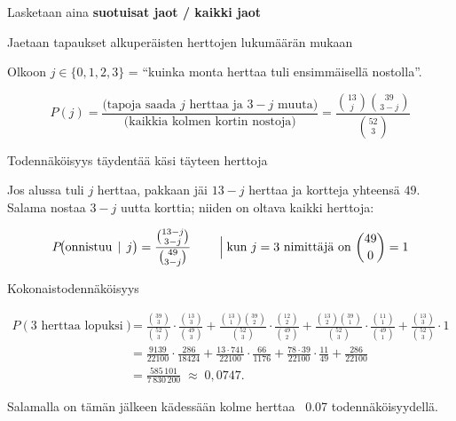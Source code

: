 \documentclass[12pt,a4paper]{article}
\begin{document}
Lasketaan aina \textbf{suotuisat jaot / kaikki jaot}
    
\begin{alakohta}
    
\item Jaetaan tapaukset alkuperäisten herttojen lukumäärän mukaan

Olkoon $j\in\{0,1,2,3\}$ = “kuinka monta herttaa tuli ensimmäisellä nostolla”.

\[
P(j)=\frac{\text{(tapoja saada $j$ herttaa ja $3-j$ muuta)}}{\text{(kaikkia kolmen kortin nostoja)}}=
\frac{\binom{13}{j}\binom{39}{3-j}}{\binom{52}{3}}
\]

\item Todennäköisyys täydentää käsi täyteen herttoja

Jos alussa tuli $j$ herttaa, pakkaan jäi $13-j$ herttaa ja kortteja yhteensä $49$.  
Salama nostaa $3-j$ uutta korttia; niiden on oltava kaikki herttoja:


\[
P\!\bigl(\text{onnistuu}\,\mid \,j\bigr)=
\frac{\binom{13-j}{3-j}}{\binom{49}{3-j}}
\qquad \Bigm| \text{kun }j=3\text{ nimittäjä on } \binom{49}{0}=1
\]

\item Kokonaistodennäköisyys

\[
\begin{aligned}
P(\text{3 herttaa lopuksi})
&=\frac{\binom{39}{3}}{\binom{52}{3}}\cdot\frac{\binom{13}{3}}{\binom{49}{3}}
 +\frac{\binom{13}{1}\binom{39}{2}}{\binom{52}{3}}\cdot\frac{\binom{12}{2}}{\binom{49}{2}}
+\frac{\binom{13}{2}\binom{39}{1}}{\binom{52}{3}}\cdot\frac{\binom{11}{1}}{\binom{49}{1}}
 +\frac{\binom{13}{3}}{\binom{52}{3}}\cdot 1 \\[6pt]
&=\frac{9139}{22100}\cdot\frac{286}{18424}
 + \frac{13\cdot 741}{22100}\cdot\frac{66}{1176}
 + \frac{78\cdot 39}{22100}\cdot\frac{11}{49}
 + \frac{286}{22100} \\[4pt]
&=\frac{585\,101}{7\,830\,200}
 \;\approx\;0{,}0747.
\end{aligned}
\]


Salamalla on tämän jälkeen 
kädessään kolme herttaa \approx\, 0.07 todennäköisyydellä.

\end{alakohta}



\pagebreak
\end{document}

